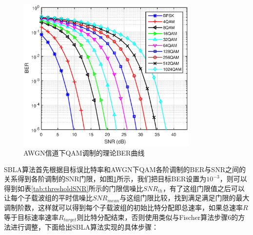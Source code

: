\begin{figure}[htbp]
\centering
\includegraphics[width=0.8\textwidth]{figures/chapter-4/theoreticalBER.eps}
\caption{AWGN信道下QAM调制的理论BER曲线}
\label{fig:theoreticalBER}
\end{figure}
SBLA算法首先根据目标误比特率和AWGN下QAM各阶调制的BER与SNR之间的关系得到各阶调制的SNR门限，如图\ref{fig:theoreticalBER}所示，我们把目标BER设置为$10^{-3}$，则可以得到如表\ref{tab:thresholdSNR}所示的门限信噪比$SNR_{th}$，有了这组门限值之后可以让每个子载波组的平时信噪比$SNR_{mean}$与这组门限比较，找到满足满足门限的最大调制阶数，这样就可以得到每个子载波组的初始比特分配即总速率，如果总速率$R$等于目标速率速率$R_{target}$则比特分配结束，否则使用类似与Fischer算法步骤6的方法进行调整，下面给出SBLA算法实现的具体步骤：
